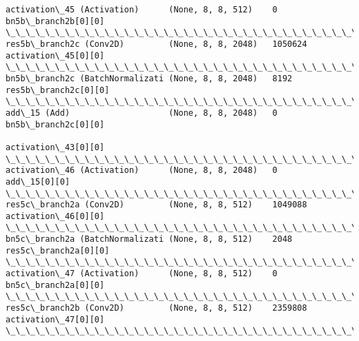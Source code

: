 \documentclass[11pt]{article}
\begin{document}
\begin{Verbatim}[commandchars=\\\{\}]
activation\_45 (Activation)      (None, 8, 8, 512)    0           bn5b\_branch2b[0][0]              
\_\_\_\_\_\_\_\_\_\_\_\_\_\_\_\_\_\_\_\_\_\_\_\_\_\_\_\_\_\_\_\_\_\_\_\_\_\_\_\_\_\_\_\_\_\_\_\_\_\_\_\_\_\_\_\_\_\_\_\_\_\_\_\_\_\_\_\_\_\_\_\_\_\_\_\_\_\_\_\_\_\_\_\_\_\_\_\_\_\_\_\_\_\_\_\_\_\_
res5b\_branch2c (Conv2D)         (None, 8, 8, 2048)   1050624     activation\_45[0][0]              
\_\_\_\_\_\_\_\_\_\_\_\_\_\_\_\_\_\_\_\_\_\_\_\_\_\_\_\_\_\_\_\_\_\_\_\_\_\_\_\_\_\_\_\_\_\_\_\_\_\_\_\_\_\_\_\_\_\_\_\_\_\_\_\_\_\_\_\_\_\_\_\_\_\_\_\_\_\_\_\_\_\_\_\_\_\_\_\_\_\_\_\_\_\_\_\_\_\_
bn5b\_branch2c (BatchNormalizati (None, 8, 8, 2048)   8192        res5b\_branch2c[0][0]             
\_\_\_\_\_\_\_\_\_\_\_\_\_\_\_\_\_\_\_\_\_\_\_\_\_\_\_\_\_\_\_\_\_\_\_\_\_\_\_\_\_\_\_\_\_\_\_\_\_\_\_\_\_\_\_\_\_\_\_\_\_\_\_\_\_\_\_\_\_\_\_\_\_\_\_\_\_\_\_\_\_\_\_\_\_\_\_\_\_\_\_\_\_\_\_\_\_\_
add\_15 (Add)                    (None, 8, 8, 2048)   0           bn5b\_branch2c[0][0]              
                                                                 activation\_43[0][0]              
\_\_\_\_\_\_\_\_\_\_\_\_\_\_\_\_\_\_\_\_\_\_\_\_\_\_\_\_\_\_\_\_\_\_\_\_\_\_\_\_\_\_\_\_\_\_\_\_\_\_\_\_\_\_\_\_\_\_\_\_\_\_\_\_\_\_\_\_\_\_\_\_\_\_\_\_\_\_\_\_\_\_\_\_\_\_\_\_\_\_\_\_\_\_\_\_\_\_
activation\_46 (Activation)      (None, 8, 8, 2048)   0           add\_15[0][0]                     
\_\_\_\_\_\_\_\_\_\_\_\_\_\_\_\_\_\_\_\_\_\_\_\_\_\_\_\_\_\_\_\_\_\_\_\_\_\_\_\_\_\_\_\_\_\_\_\_\_\_\_\_\_\_\_\_\_\_\_\_\_\_\_\_\_\_\_\_\_\_\_\_\_\_\_\_\_\_\_\_\_\_\_\_\_\_\_\_\_\_\_\_\_\_\_\_\_\_
res5c\_branch2a (Conv2D)         (None, 8, 8, 512)    1049088     activation\_46[0][0]              
\_\_\_\_\_\_\_\_\_\_\_\_\_\_\_\_\_\_\_\_\_\_\_\_\_\_\_\_\_\_\_\_\_\_\_\_\_\_\_\_\_\_\_\_\_\_\_\_\_\_\_\_\_\_\_\_\_\_\_\_\_\_\_\_\_\_\_\_\_\_\_\_\_\_\_\_\_\_\_\_\_\_\_\_\_\_\_\_\_\_\_\_\_\_\_\_\_\_
bn5c\_branch2a (BatchNormalizati (None, 8, 8, 512)    2048        res5c\_branch2a[0][0]             
\_\_\_\_\_\_\_\_\_\_\_\_\_\_\_\_\_\_\_\_\_\_\_\_\_\_\_\_\_\_\_\_\_\_\_\_\_\_\_\_\_\_\_\_\_\_\_\_\_\_\_\_\_\_\_\_\_\_\_\_\_\_\_\_\_\_\_\_\_\_\_\_\_\_\_\_\_\_\_\_\_\_\_\_\_\_\_\_\_\_\_\_\_\_\_\_\_\_
activation\_47 (Activation)      (None, 8, 8, 512)    0           bn5c\_branch2a[0][0]              
\_\_\_\_\_\_\_\_\_\_\_\_\_\_\_\_\_\_\_\_\_\_\_\_\_\_\_\_\_\_\_\_\_\_\_\_\_\_\_\_\_\_\_\_\_\_\_\_\_\_\_\_\_\_\_\_\_\_\_\_\_\_\_\_\_\_\_\_\_\_\_\_\_\_\_\_\_\_\_\_\_\_\_\_\_\_\_\_\_\_\_\_\_\_\_\_\_\_
res5c\_branch2b (Conv2D)         (None, 8, 8, 512)    2359808     activation\_47[0][0]              
\_\_\_\_\_\_\_\_\_\_\_\_\_\_\_\_\_\_\_\_\_\_\_\_\_\_\_\_\_\_\_\_\_\_\_\_\_\_\_\_\_\_\_\_\_\_\_\_\_\_\_\_\_\_\_\_\_\_\_\_\_\_\_\_\_\_\_\_\_\_\_\_\_\_\_\_\_\_\_\_\_\_\_\_\_\_\_\_\_\_\_\_\_\_\_\_\_\_

\end{Verbatim}
\end{document}
